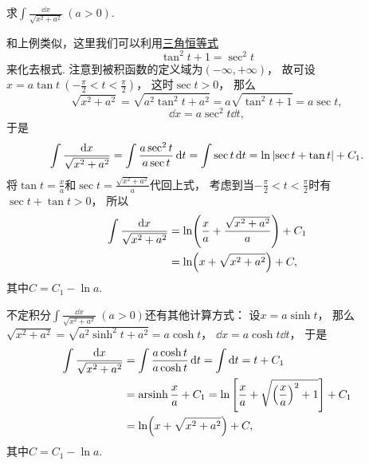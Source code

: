 \begin{example}
求\(\int \frac{\dd{x}}{\sqrt{x^2 + a^2}}\ (a>0)\).
\begin{solution}
和上例类似，这里我们可以利用\hyperref[equation:三角函数.毕达哥拉斯三角恒等式2]{三角恒等式}\begin{equation*}
	\tan^2 t + 1 = \sec^2 t
\end{equation*}来化去根式.
注意到被积函数的定义域为\((-\infty,+\infty)\)，
故可设\(x = a \tan t\ (-\frac\pi2 < t < \frac\pi2)\)，
这时\(\sec t > 0\)，
那么\begin{equation*}
	\sqrt{x^2 + a^2}
	= \sqrt{a^2 \tan^2 t + a^2}
	= a \sqrt{\tan^2 t + 1}
	= a \sec t,
\end{equation*}\begin{equation*}
	\dd{x} = a \sec^2 t \dd{t},
\end{equation*}
于是\begin{equation*}
	\int \frac{\dd{x}}{\sqrt{x^2 + a^2}}
	= \int \frac{a \sec^2 t}{a \sec t} \dd{t}
	= \int \sec t \dd{t}
	= \ln\abs{\sec t + \tan t} + C_1.
\end{equation*}
将\(\tan t = \frac{x}{a}\)和\(\sec t = \frac{\sqrt{x^2+a^2}}{a}\)代回上式，
考虑到当\(-\frac\pi2 < t < \frac\pi2\)时有\(\sec t + \tan t > 0\)，
所以\begin{align}
	\int \frac{\dd{x}}{\sqrt{x^2 + a^2}}
	&= \ln( \frac{x}{a} + \frac{\sqrt{x^2 + a^2}}{a} ) + C_1 \notag \\
	&= \ln(x + \sqrt{x^2 + a^2}) + C,
\end{align}
其中\(C = C_1 - \ln a\).
\end{solution}
\end{example}
\begin{remark}
不定积分\(\int \frac{\dd{x}}{\sqrt{x^2 + a^2}}\ (a>0)\)还有其他计算方式：
设\(x = a \sinh t\)，
那么\(\sqrt{x^2+a^2}
=\sqrt{a^2\sinh^2t+a^2}
=a\cosh t\)，
\(\dd{x}=a\cosh t\dd{t}\)，
于是\begin{align*}
	\int\frac{\dd{x}}{\sqrt{x^2+a^2}}
	&= \int\frac{a\cosh t}{a\cosh t}\dd{t}
	= \int\dd{t}
	= t+C_1 \\
	&= \operatorname{arsinh}\frac{x}{a} + C_1
	= \ln\left[\frac{x}{a}+\sqrt{\left(\frac{x}{a}\right)^2+1}\right] + C_1 \\
	&= \ln(x+\sqrt{x^2+a^2})+C,
\end{align*}
其中\(C=C_1-\ln a\).
\end{remark}

